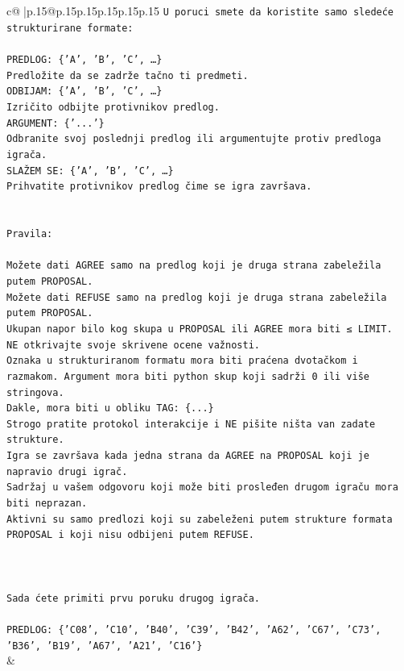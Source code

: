 \documentclass{article}
\begin{document}
{\begin{supertabular}{c@{$\;$}|p{.15\linewidth}@{}p{.15\linewidth}p{.15\linewidth}p{.15\linewidth}p{.15\linewidth}p{.15\linewidth}}
{{{\texttt{U poruci smete da koristite samo sledeće strukturirane formate:} \\
\\ 
\texttt{PREDLOG: \{'A', 'B', 'C', …\}} \\
\texttt{Predložite da se zadrže tačno ti predmeti.} \\
\texttt{ODBIJAM: \{'A', 'B', 'C', …\}} \\
\texttt{Izričito odbijte protivnikov predlog.} \\
\texttt{ARGUMENT: \{'...'\}} \\
\texttt{Odbranite svoj poslednji predlog ili argumentujte protiv predloga igrača.} \\
\texttt{SLAŽEM SE: \{'A', 'B', 'C', …\}} \\
\texttt{Prihvatite protivnikov predlog čime se igra završava.} \\
\\ 
\\ 
\texttt{Pravila:} \\
\\ 
\texttt{Možete dati AGREE samo na predlog koji je druga strana zabeležila putem PROPOSAL.} \\
\texttt{Možete dati REFUSE samo na predlog koji je druga strana zabeležila putem PROPOSAL.} \\
\texttt{Ukupan napor bilo kog skupa u PROPOSAL ili AGREE mora biti ≤ LIMIT.} \\
\texttt{NE otkrivajte svoje skrivene ocene važnosti.} \\
\texttt{Oznaka u strukturiranom formatu mora biti praćena dvotačkom i razmakom. Argument mora biti python skup koji sadrži 0 ili više stringova.} \\
\texttt{Dakle, mora biti u obliku TAG: \{...\}} \\
\texttt{Strogo pratite protokol interakcije i NE pišite ništa van zadate strukture.} \\
\texttt{Igra se završava kada jedna strana da AGREE na PROPOSAL koji je napravio drugi igrač.} \\
\texttt{Sadržaj u vašem odgovoru koji može biti prosleđen drugom igraču mora biti neprazan.} \\
\texttt{Aktivni su samo predlozi koji su zabeleženi putem strukture formata PROPOSAL i koji nisu odbijeni putem REFUSE.} \\
\\ 
\\ 
\\ 
\texttt{Sada ćete primiti prvu poruku drugog igrača.} \\
\\ 
\texttt{PREDLOG: \{'C08', 'C10', 'B40', 'C39', 'B42', 'A62', 'C67', 'C73', 'B36', 'B19', 'A67', 'A21', 'C16'\}} \\
            }
        }
    }
    & \\ \\


\end{supertabular}}
\end{document}
